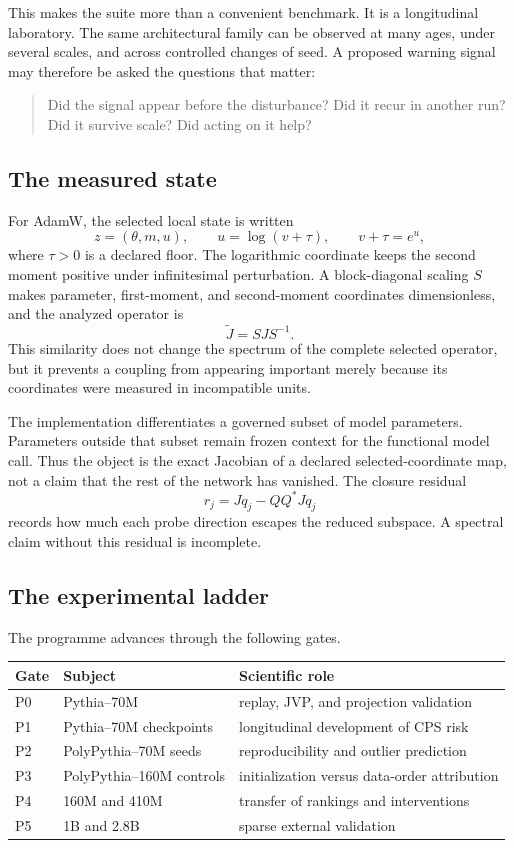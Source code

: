This makes the suite more than a convenient benchmark.  It is a longitudinal laboratory.  The same architectural family can be observed at many ages, under several scales, and across controlled changes of seed.  A proposed warning signal may therefore be asked the questions that matter:
\begin{quote}
Did the signal appear before the disturbance?  Did it recur in another run?  Did it survive scale?  Did acting on it help?
\end{quote}

\subsection{The measured state}

For AdamW, the selected local state is written
\[
z=(\theta,m,u),
\qquad
u=\log(v+\tau),
\qquad
v+\tau=e^u,
\]
where \(\tau>0\) is a declared floor.  The logarithmic coordinate keeps the second moment positive under infinitesimal perturbation.  A block-diagonal scaling \(S\) makes parameter, first-moment, and second-moment coordinates dimensionless, and the analyzed operator is
\[
\widetilde J=SJS^{-1}.
\]
This similarity does not change the spectrum of the complete selected operator, but it prevents a coupling from appearing important merely because its coordinates were measured in incompatible units.

The implementation differentiates a governed subset of model parameters.  Parameters outside that subset remain frozen context for the functional model call.  Thus the object is the exact Jacobian of a declared selected-coordinate map, not a claim that the rest of the network has vanished.  The closure residual
\[
r_j=Jq_j-QQ^*Jq_j
\]
records how much each probe direction escapes the reduced subspace.  A spectral claim without this residual is incomplete.

\subsection{The experimental ladder}

The programme advances through the following gates.

\begin{center}
\begin{tabular}{@{}lll@{}}
\toprule
Gate & Subject & Scientific role \\
\midrule
P0 & Pythia--70M & replay, JVP, and projection validation \\
P1 & Pythia--70M checkpoints & longitudinal development of CPS risk \\
P2 & PolyPythia--70M seeds & reproducibility and outlier prediction \\
P3 & PolyPythia--160M controls & initialization versus data-order attribution \\
P4 & 160M and 410M & transfer of rankings and interventions \\
P5 & 1B and 2.8B & sparse external validation \\
\bottomrule
\end{tabular}
\end{center}


